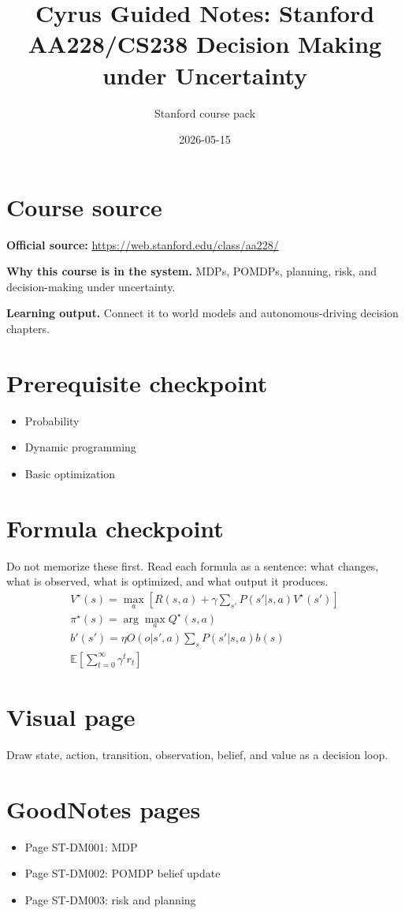 \documentclass[11pt]{article}
\title{Cyrus Guided Notes: Stanford AA228/CS238 Decision Making under Uncertainty}
\author{Stanford course pack}
\date{2026-05-15}
\begin{document}
\maketitle

\section*{Course source}
\textbf{Official source:} \url{https://web.stanford.edu/class/aa228/}

\textbf{Why this course is in the system.} MDPs, POMDPs, planning, risk, and decision-making under uncertainty.

\textbf{Learning output.} Connect it to world models and autonomous-driving decision chapters.

\section*{Prerequisite checkpoint}
\begin{itemize}[leftmargin=1.4em]
  \item Probability
  \item Dynamic programming
  \item Basic optimization
\end{itemize}

\section*{Formula checkpoint}
Do not memorize these first. Read each formula as a sentence: what changes, what is observed, what is optimized, and what output it produces.
\begin{align*}
  V^{\star}(s)=\max_a\left[R(s,a)+\gamma\sum_{s'}P(s'|s,a)V^{\star}(s')\right]\\
  \pi^{\star}(s)=\arg\max_a Q^{\star}(s,a)\\
  b'(s')=\eta O(o|s',a)\sum_s P(s'|s,a)b(s)\\
  \mathbb{E}\left[\sum_{t=0}^{\infty}\gamma^t r_t\right]
\end{align*}

\section*{Visual page}
Draw state, action, transition, observation, belief, and value as a decision loop.

\section*{GoodNotes pages}
\begin{itemize}[leftmargin=1.4em]
  \item Page ST-DM001: MDP
  \item Page ST-DM002: POMDP belief update
  \item Page ST-DM003: risk and planning
\end{itemize}
\end{document}
